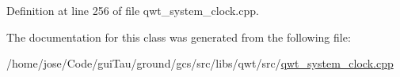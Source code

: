 Definition at line 256 of file qwt\-\_\-system\-\_\-clock.\-cpp.



The documentation for this class was generated from the following file\-:\begin{DoxyCompactItemize}
\item 
/home/jose/\-Code/gui\-Tau/ground/gcs/src/libs/qwt/src/\hyperlink{qwt__system__clock_8cpp}{qwt\-\_\-system\-\_\-clock.\-cpp}\end{DoxyCompactItemize}
